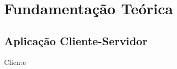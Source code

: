 \section{Fundamentação Teórica}\label{sec:fundamentacao-teorica}

\subsection{Aplicação Cliente-Servidor}

\begin{frame}{Cliente}
	
\end{frame}


	





	


	
